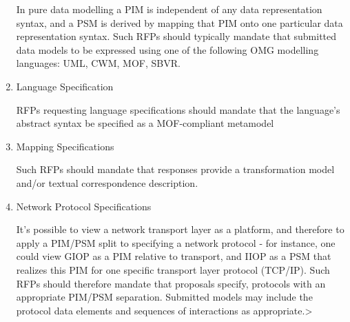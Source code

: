 \begin{itshape}
\begin{enumerate}
In pure data modelling a PIM is independent of any data representation syntax, and a PSM is derived by mapping that PIM onto one particular data representation syntax. Such RFPs should typically mandate that submitted data models to be expressed using one of the following OMG modelling languages: UML, CWM, MOF, SBVR. 
\item Language Specification

RFPs requesting language specifications should mandate that the language's abstract syntax be specified as a MOF-compliant metamodel
\item Mapping Specifications

Such RFPs should mandate that responses provide a transformation model and/or textual correspondence description.
\item Network Protocol Specifications

It's possible to view a network transport layer as a platform, and therefore to apply a PIM/PSM split to specifying a network protocol - for instance, one could view GIOP as a PIM relative to transport, and IIOP as a PSM that realizes this PIM for one specific transport layer protocol (TCP/IP). Such RFPs should therefore mandate that proposals specify, protocols with an appropriate PIM/PSM separation. Submitted models may include the protocol data elements and sequences of interactions as appropriate.>
\end{enumerate}
\end{itshape}


